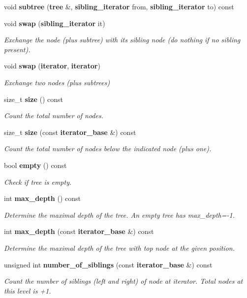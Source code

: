 \begin{DoxyCompactItemize}
void {\bf subtree} ({\bf tree} \&, {\bf sibling\+\_\+iterator} from, {\bf sibling\+\_\+iterator} to) const 
\item 
void {\bf swap} ({\bf sibling\+\_\+iterator} it)
\begin{DoxyCompactList}\small\item\em Exchange the node (plus subtree) with its sibling node (do nothing if no sibling present). \end{DoxyCompactList}\item 
void {\bf swap} ({\bf iterator}, {\bf iterator})
\begin{DoxyCompactList}\small\item\em Exchange two nodes (plus subtrees) \end{DoxyCompactList}\item 
size\+\_\+t {\bf size} () const 
\begin{DoxyCompactList}\small\item\em Count the total number of nodes. \end{DoxyCompactList}\item 
size\+\_\+t {\bf size} (const {\bf iterator\+\_\+base} \&) const 
\begin{DoxyCompactList}\small\item\em Count the total number of nodes below the indicated node (plus one). \end{DoxyCompactList}\item 
bool {\bf empty} () const 
\begin{DoxyCompactList}\small\item\em Check if tree is empty. \end{DoxyCompactList}\item 
int {\bf max\+\_\+depth} () const 
\begin{DoxyCompactList}\small\item\em Determine the maximal depth of the tree. An empty tree has max\+\_\+depth=-\/1. \end{DoxyCompactList}\item 
int {\bf max\+\_\+depth} (const {\bf iterator\+\_\+base} \&) const 
\begin{DoxyCompactList}\small\item\em Determine the maximal depth of the tree with top node at the given position. \end{DoxyCompactList}\item 
unsigned int {\bf number\+\_\+of\+\_\+siblings} (const {\bf iterator\+\_\+base} \&) const 
\begin{DoxyCompactList}\small\item\em Count the number of siblings (left and right) of node at iterator. Total nodes at this level is +1. \end{DoxyCompactList}\item 

\end{DoxyCompactItemize}
